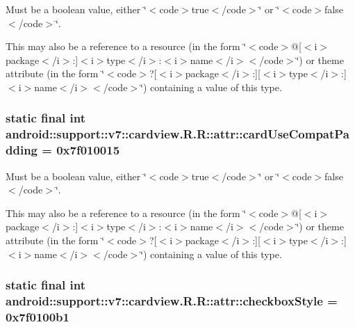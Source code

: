 Must be a boolean value, either \char`\"{}$<$code$>$true$<$/code$>$\char`\"{} or \char`\"{}$<$code$>$false$<$/code$>$\char`\"{}. 

This may also be a reference to a resource (in the form \char`\"{}$<$code$>$@\mbox{[}$<$i$>$package$<$/i$>$:\mbox{]}$<$i$>$type$<$/i$>$:$<$i$>$name$<$/i$>$$<$/code$>$\char`\"{}) or theme attribute (in the form \char`\"{}$<$code$>$?\mbox{[}$<$i$>$package$<$/i$>$:\mbox{]}\mbox{[}$<$i$>$type$<$/i$>$:\mbox{]}$<$i$>$name$<$/i$>$$<$/code$>$\char`\"{}) containing a value of this type. \hypertarget{classandroid_1_1support_1_1v7_1_1cardview_1_1_r_1_1attr_1c92865709b82ae9747d70a65eb68ac9}{
\subsubsection[{cardUseCompatPadding}]{\setlength{\rightskip}{0pt plus 5cm}static final int android::support::v7::cardview.R.R::attr::cardUseCompatPadding = 0x7f010015}}
\label{classandroid_1_1support_1_1v7_1_1cardview_1_1_r_1_1attr_1c92865709b82ae9747d70a65eb68ac9}


Must be a boolean value, either \char`\"{}$<$code$>$true$<$/code$>$\char`\"{} or \char`\"{}$<$code$>$false$<$/code$>$\char`\"{}. 

This may also be a reference to a resource (in the form \char`\"{}$<$code$>$@\mbox{[}$<$i$>$package$<$/i$>$:\mbox{]}$<$i$>$type$<$/i$>$:$<$i$>$name$<$/i$>$$<$/code$>$\char`\"{}) or theme attribute (in the form \char`\"{}$<$code$>$?\mbox{[}$<$i$>$package$<$/i$>$:\mbox{]}\mbox{[}$<$i$>$type$<$/i$>$:\mbox{]}$<$i$>$name$<$/i$>$$<$/code$>$\char`\"{}) containing a value of this type. \hypertarget{classandroid_1_1support_1_1v7_1_1cardview_1_1_r_1_1attr_155eab17b0c149aac70a8bcf6d5bdf57}{
\subsubsection[{checkboxStyle}]{\setlength{\rightskip}{0pt plus 5cm}static final int android::support::v7::cardview.R.R::attr::checkboxStyle = 0x7f0100b1}}
\label{classandroid_1_1support_1_1v7_1_1cardview_1_1_r_1_1attr_155eab17b0c149aac70a8bcf6d5bdf57}



